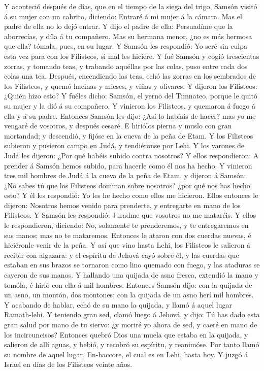  Y aconteció después de días, que en el tiempo de la siega
del trigo, Samsón visitó á su mujer con un cabrito, diciendo: Entraré á
mi mujer á la cámara. Mas el padre de ella no lo dejó entrar.
 Y dijo el padre de ella: Persuadíme que la aborrecías, y
díla á tu compañero. Mas su hermana menor, ¿no es más hermosa que ella?
tómala, pues, en su lugar.  Y Samsón les respondió: Yo seré
sin culpa esta vez para con los Filisteos, si mal les hiciere.
 Y fué Samsón y cogió trescientas zorras, y tomando teas, y
trabando aquéllas por las colas, puso entre cada dos colas una tea.
 Después, encendiendo las teas, echó las zorras en los
sembrados de los Filisteos, y quemó hacinas y mieses, y viñas y
olivares.  Y dijeron los Filisteos: ¿Quién hizo esto? Y
fuéles dicho: Samsón, el yerno del Timnateo, porque le quitó su mujer y
la dió á su compañero. Y vinieron los Filisteos, y quemaron á fuego á
ella y á su padre.  Entonces Samsón les dijo: ¿Así lo
habíais de hacer? mas yo me vengaré de vosotros, y después cesaré.
 E hiriólos pierna y muslo con gran mortandad; y descendió,
y fijóse en la cueva de la peña de Etam.  Y los Filisteos
subieron y pusieron campo en Judá, y tendiéronse por Lehi. 
Y los varones de Judá les dijeron: ¿Por qué habéis subido contra
nosotros? Y ellos respondieron: A prender á Samsón hemos subido, para
hacerle como él nos ha hecho.  Y vinieron tres mil hombres
de Judá á la cueva de la peña de Etam, y dijeron á Samsón: ¿No sabes tú
que los Filisteos dominan sobre nosotros? ¿por qué nos has hecho esto? Y
él les respondió: Yo les he hecho como ellos me hicieron. 
Ellos entonces le dijeron: Nosotros hemos venido para prenderte, y
entregarte en mano de los Filisteos. Y Samsón les respondió: Juradme que
vosotros no me mataréis.  Y ellos le respondieron,
diciendo: No, solamente te prenderemos, y te entregaremos en sus manos;
mas no te mataremos. Entonces le ataron con dos cuerdas nuevas, é
hiciéronle venir de la peña.  Y así que vino hasta Lehi,
los Filisteos le salieron á recibir con algazara: y el espíritu de
Jehová cayó sobre él, y las cuerdas que estaban en sus brazos se
tornaron como lino quemado con fuego, y las ataduras se cayeron de sus
manos.  Y hallando una quijada de asno fresca, extendió la
mano y tomóla, é hirió con ella á mil hombres.  Entonces
Samsón dijo: con la quijada de un asno, un montón, dos montones; con la
quijada de un asno herí mil hombres.  Y acabando de hablar,
echó de su mano la quijada, y llamó á aquel lugar Ramath-lehi.
 Y teniendo gran sed, clamó luego á Jehová, y dijo: Tú has
dado esta gran salud por mano de tu siervo: ¿y moriré yo ahora de sed, y
caeré en mano de los incircuncisos?  Entonces quebró Dios
una muela que estaba en la quijada, y salieron de allí aguas, y bebió, y
recobró su espíritu, y reanimóse. Por tanto llamó su nombre de aquel
lugar, En-haccore, el cual es en Lehi, hasta hoy.  Y juzgó
á Israel en días de los Filisteos veinte años.

